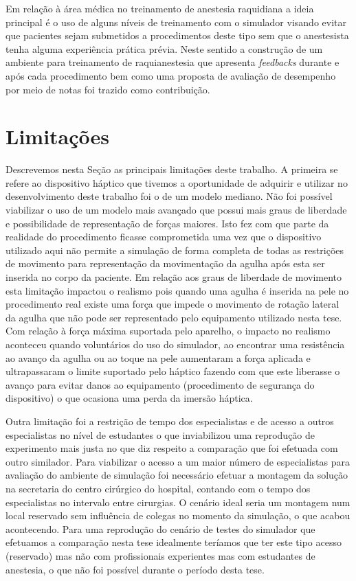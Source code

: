 Em relação à área médica no treinamento de anestesia raquidiana a ideia principal é o uso de alguns níveis de treinamento com o simulador visando evitar que pacientes sejam submetidos a procedimentos deste tipo sem que o anestesista tenha alguma experiência prática prévia. Neste sentido a construção de um ambiente para treinamento de raquianestesia que apresenta \textit{feedbacks} durante e após cada procedimento bem como uma proposta de avaliação de desempenho por meio de notas foi trazido como contribuição. 

\section{Limitações}

Descrevemos nesta Seção as principais limitações deste trabalho. A primeira se refere ao dispositivo háptico que tivemos a oportunidade de adquirir e utilizar no desenvolvimento deste trabalho foi o de um modelo mediano. Não foi possível viabilizar o uso de um modelo mais avançado que possui mais graus de liberdade e possibilidade de representação de forças maiores. Isto fez com que parte da realidade do procedimento ficasse comprometida uma vez que o dispositivo utilizado aqui não permite a simulação de forma completa de todas as restrições de movimento para representação da movimentação da agulha após esta ser inserida no corpo da paciente. Em relação aos graus de liberdade de movimento esta limitação impactou o realismo pois quando uma agulha é inserida na pele no procedimento real existe uma força que impede o movimento de rotação lateral da agulha que não pode ser representado pelo equipamento utilizado nesta tese. Com relação à força máxima suportada pelo aparelho, o impacto no realismo aconteceu quando voluntários do uso do simulador, ao encontrar uma resistência ao avanço da agulha ou ao toque na pele aumentaram a força aplicada e ultrapassaram o limite suportado pelo háptico fazendo com que este liberasse o avanço para evitar danos ao equipamento (procedimento de segurança do dispositivo) o que ocasiona uma perda da imersão háptica.   

Outra limitação foi a restrição de tempo dos especialistas e de acesso a outros especialistas no nível de estudantes o que inviabilizou uma reprodução de experimento mais justa no que diz respeito a comparação que foi efetuada com outro similador. Para viabilizar o acesso a um maior número de especialistas para avaliação do ambiente de simulação foi necessário efetuar a montagem da solução na secretaria do centro cirúrgico do hospital, contando com o tempo dos especialistas no intervalo entre cirurgias. O cenário ideal seria um montagem num local reservado sem influência de colegas no momento da simulação, o que acabou acontecendo. Para uma reprodução do cenário de testes do simulador que efetuamos a comparação nesta tese idealmente teríamos que ter este tipo acesso (reservado) mas não com profissionais experientes mas com estudantes de anestesia, o que não foi possível durante o período desta tese.  

